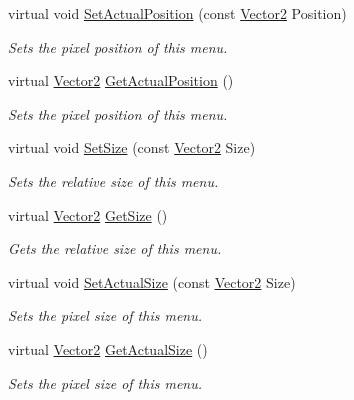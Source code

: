 \begin{DoxyCompactItemize}
virtual void \hyperlink{classphys_1_1UI_1_1Menu_a18161cae59d7a8be52a2d77e27e0c5a1}{SetActualPosition} (const \hyperlink{classphys_1_1Vector2}{Vector2} Position)
\begin{DoxyCompactList}\small\item\em Sets the pixel position of this menu. \item\end{DoxyCompactList}\item 
virtual \hyperlink{classphys_1_1Vector2}{Vector2} \hyperlink{classphys_1_1UI_1_1Menu_a74a1b8e9b1c5d36c12e5a0a7f813c40a}{GetActualPosition} ()
\begin{DoxyCompactList}\small\item\em Sets the pixel position of this menu. \item\end{DoxyCompactList}\item 
virtual void \hyperlink{classphys_1_1UI_1_1Menu_a1f8826ab4ab9e76441704634746d3147}{SetSize} (const \hyperlink{classphys_1_1Vector2}{Vector2} Size)
\begin{DoxyCompactList}\small\item\em Sets the relative size of this menu. \item\end{DoxyCompactList}\item 
virtual \hyperlink{classphys_1_1Vector2}{Vector2} \hyperlink{classphys_1_1UI_1_1Menu_a81781199a62bbe7c2e7693ef301223b4}{GetSize} ()
\begin{DoxyCompactList}\small\item\em Gets the relative size of this menu. \item\end{DoxyCompactList}\item 
virtual void \hyperlink{classphys_1_1UI_1_1Menu_a9bbb3c347fa49cb0f3cbe50293966cf3}{SetActualSize} (const \hyperlink{classphys_1_1Vector2}{Vector2} Size)
\begin{DoxyCompactList}\small\item\em Sets the pixel size of this menu. \item\end{DoxyCompactList}\item 
virtual \hyperlink{classphys_1_1Vector2}{Vector2} \hyperlink{classphys_1_1UI_1_1Menu_af7566b83c50a4a02ac78d174d7c61817}{GetActualSize} ()
\begin{DoxyCompactList}\small\item\em Sets the pixel size of this menu. \item\end{DoxyCompactList}\item 

\end{DoxyCompactItemize}
